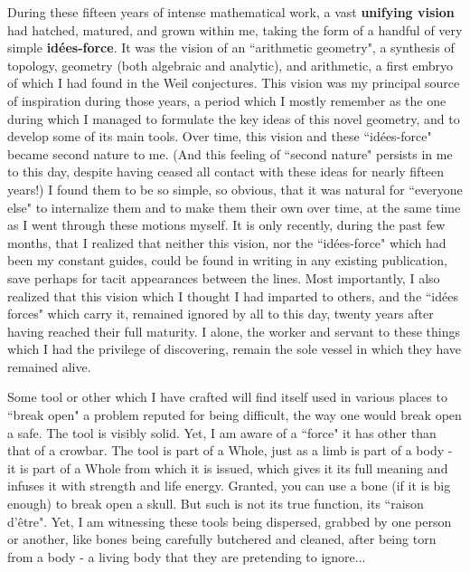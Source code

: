 During these fifteen years of intense mathematical work, a vast \textbf{unifying vision} had hatched, matured, and grown within me, taking the form of a handful of very simple \textbf{id\'ees-force}. It was the vision of an ``arithmetic geometry", a synthesis of topology, geometry (both algebraic and analytic), and arithmetic, a first embryo of which I had found in the Weil conjectures. This vision was my principal source of inspiration during those years, a period which I mostly remember as the one during which I managed to formulate the key ideas of this novel geometry, and to develop some of its main tools. Over time, this vision and these ``id\'ees-force" became second nature to me. (And this feeling of ``second nature" persists in me to this day, despite having ceased all contact with these ideas for nearly fifteen years!) I found them to be so simple, so obvious, that it was natural for ``everyone else" to internalize them and to make them their own over time, at the same time as I went through these motions myself. It is only recently, during the past few months, that I realized that neither this vision, nor the ``id\'ees-force" which had been my constant guides, could be found in writing in any existing publication, save perhaps for tacit appearances between the lines. Most importantly, I also realized that this vision which I thought I had imparted to others, and the ``id\'ees forces" which carry it, remained ignored by all to this day, twenty years after having reached their full maturity. I alone, the worker and servant to these things which I had the privilege of discovering, remain the sole vessel in which they have remained alive.

Some tool or other which I have crafted will find itself used in various places to ``break open" a problem reputed for being difficult, the way one would break open a safe. The tool is visibly solid. Yet, I am aware of a  ``force" it has other than that of a crowbar. The tool is part of a Whole, just as a limb is part of a body - it is part of a Whole from which it is issued, which gives it its full meaning and infuses it with strength and life energy. Granted, you can use a bone (if it is big enough) to break open a skull. But such is not its true function, its ``raison d'\^etre". Yet, I am witnessing these tools being dispersed, grabbed by one person or another, like bones being carefully butchered and cleaned, after being torn from a body - a living body that they are pretending to ignore...

